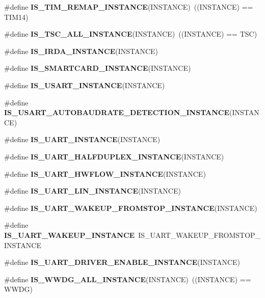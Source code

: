 \begin{DoxyCompactItemize}
\item 
\mbox{\label{group___exported__macro_ga6bb03cf116b07bfe1bd527f8ab61a7f9}} 
\#define {\bfseries I\+S\+\_\+\+T\+I\+M\+\_\+\+R\+E\+M\+A\+P\+\_\+\+I\+N\+S\+T\+A\+N\+CE}(I\+N\+S\+T\+A\+N\+CE)~((I\+N\+S\+T\+A\+N\+CE) == T\+I\+M14)
\item 
\mbox{\label{group___exported__macro_gaf29af2609f6b7748104a965262e95475}} 
\#define {\bfseries I\+S\+\_\+\+T\+S\+C\+\_\+\+A\+L\+L\+\_\+\+I\+N\+S\+T\+A\+N\+CE}(I\+N\+S\+T\+A\+N\+CE)~((I\+N\+S\+T\+A\+N\+CE) == T\+SC)
\item 
\#define {\bfseries I\+S\+\_\+\+I\+R\+D\+A\+\_\+\+I\+N\+S\+T\+A\+N\+CE}(I\+N\+S\+T\+A\+N\+CE)
\item 
\#define {\bfseries I\+S\+\_\+\+S\+M\+A\+R\+T\+C\+A\+R\+D\+\_\+\+I\+N\+S\+T\+A\+N\+CE}(I\+N\+S\+T\+A\+N\+CE)
\item 
\#define {\bfseries I\+S\+\_\+\+U\+S\+A\+R\+T\+\_\+\+I\+N\+S\+T\+A\+N\+CE}(I\+N\+S\+T\+A\+N\+CE)
\item 
\#define {\bfseries I\+S\+\_\+\+U\+S\+A\+R\+T\+\_\+\+A\+U\+T\+O\+B\+A\+U\+D\+R\+A\+T\+E\+\_\+\+D\+E\+T\+E\+C\+T\+I\+O\+N\+\_\+\+I\+N\+S\+T\+A\+N\+CE}(I\+N\+S\+T\+A\+N\+CE)
\item 
\#define {\bfseries I\+S\+\_\+\+U\+A\+R\+T\+\_\+\+I\+N\+S\+T\+A\+N\+CE}(I\+N\+S\+T\+A\+N\+CE)
\item 
\#define {\bfseries I\+S\+\_\+\+U\+A\+R\+T\+\_\+\+H\+A\+L\+F\+D\+U\+P\+L\+E\+X\+\_\+\+I\+N\+S\+T\+A\+N\+CE}(I\+N\+S\+T\+A\+N\+CE)
\item 
\#define {\bfseries I\+S\+\_\+\+U\+A\+R\+T\+\_\+\+H\+W\+F\+L\+O\+W\+\_\+\+I\+N\+S\+T\+A\+N\+CE}(I\+N\+S\+T\+A\+N\+CE)
\item 
\#define {\bfseries I\+S\+\_\+\+U\+A\+R\+T\+\_\+\+L\+I\+N\+\_\+\+I\+N\+S\+T\+A\+N\+CE}(I\+N\+S\+T\+A\+N\+CE)
\item 
\#define {\bfseries I\+S\+\_\+\+U\+A\+R\+T\+\_\+\+W\+A\+K\+E\+U\+P\+\_\+\+F\+R\+O\+M\+S\+T\+O\+P\+\_\+\+I\+N\+S\+T\+A\+N\+CE}(I\+N\+S\+T\+A\+N\+CE)
\item 
\mbox{\label{group___exported__macro_ga69e32d838272d886316fcfa378605ed0}} 
\#define {\bfseries I\+S\+\_\+\+U\+A\+R\+T\+\_\+\+W\+A\+K\+E\+U\+P\+\_\+\+I\+N\+S\+T\+A\+N\+CE}~I\+S\+\_\+\+U\+A\+R\+T\+\_\+\+W\+A\+K\+E\+U\+P\+\_\+\+F\+R\+O\+M\+S\+T\+O\+P\+\_\+\+I\+N\+S\+T\+A\+N\+CE
\item 
\#define {\bfseries I\+S\+\_\+\+U\+A\+R\+T\+\_\+\+D\+R\+I\+V\+E\+R\+\_\+\+E\+N\+A\+B\+L\+E\+\_\+\+I\+N\+S\+T\+A\+N\+CE}(I\+N\+S\+T\+A\+N\+CE)
\item 
\mbox{\label{group___exported__macro_gac2a8aaec233e19987232455643a04d6f}} 
\#define {\bfseries I\+S\+\_\+\+W\+W\+D\+G\+\_\+\+A\+L\+L\+\_\+\+I\+N\+S\+T\+A\+N\+CE}(I\+N\+S\+T\+A\+N\+CE)~((I\+N\+S\+T\+A\+N\+CE) == W\+W\+DG)
\end{DoxyCompactItemize}


